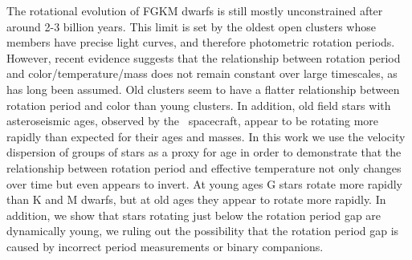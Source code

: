 The rotational evolution of FGKM dwarfs is still mostly unconstrained after
around 2-3 billion years.
This limit is set by the oldest open clusters whose members have precise light
curves, and therefore photometric rotation periods.
However, recent evidence suggests that the relationship between rotation
period and color/temperature/mass does not remain constant over large
timescales, as has long been assumed.
Old clusters seem to have a flatter relationship between rotation period and
color than young clusters.
In addition, old field stars with asteroseismic ages, observed by the \kepler\
spacecraft, appear to be rotating more rapidly than expected for their ages
and masses.
In this work we use the velocity dispersion of groups of stars as a proxy for
age in order to demonstrate that the relationship between rotation period and
effective temperature not only changes over time but even appears to invert.
At young ages G stars rotate more rapidly than K and M dwarfs, but at old ages
they appear to rotate more rapidly.
In addition, we show that stars rotating just below the rotation period gap
are dynamically young, we ruling out the possibility that the rotation period
gap is caused by incorrect period measurements or binary companions.
